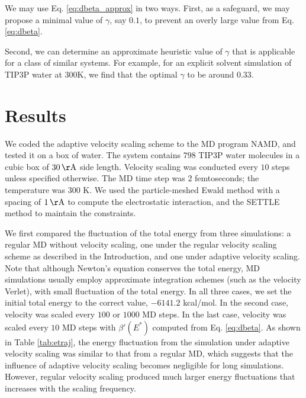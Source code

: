 \documentclass[reprint]{revtex4-1}
\begin{document}
We may use Eq. \eqref{eq:dbeta_approx} in two ways.
%
First, as a safeguard,
we may propose a minimal value of $\gamma$, say $0.1$,
to prevent an overly large value from Eq. \eqref{eq:dbeta}.

Second,
we can determine an approximate heuristic value of $\gamma$
that is applicable for a class of similar systems.
%
For example,
for an explicit solvent simulation of TIP3P water\cite{jorgensen1983}
at 300K, we find that the optimal $\gamma$
to be around $0.33$.



\section{Results}



We coded the adaptive velocity scaling scheme to
the MD program NAMD\cite{NAMD},
and tested it on a box of water.
%
The system contains
$798$ TIP3P water molecules\cite{jorgensen1983}
in a cubic box of $30 \, \mathrm{\AA}$ side length.
%
Velocity scaling was conducted every $10$ steps
unless specified otherwise.
%
The MD time step was $2$ femtoseconds;
the temperature was $300$ K.
%
We used the particle-meshed Ewald method\cite{essmann1995}
with a spacing of $1 \, \mathrm{\AA}$
to compute the electrostatic interaction,
and the SETTLE method\cite{miyamoto1992}
to maintain the constraints.


We first compared the fluctuation of the total energy
from three simulations:
%
a regular MD without velocity scaling,
one under the regular velocity scaling scheme as described in the Introduction,
and one under adaptive velocity scaling.
%
Note that although Newton's equation conserves the total energy,
MD simulations usually employ approximate integration schemes
(such as the velocity Verlet),
with
small fluctuation of the total energy.
%
In all three cases,
we set the initial total energy to the correct value, $-6141.2$ kcal/mol.
%
In the second case,
velocity was scaled every $100$ or $1000$ MD steps.
%
In the last case,
velocity was scaled every $10$ MD steps with
$\beta'(E^*)$ computed from Eq. \eqref{eq:dbeta}.
%
As shown in Table \ref{tab:etraj},
the energy fluctuation from the simulation under adaptive velocity scaling
was similar to that from a regular MD,
which suggests that the influence of adaptive velocity scaling
becomes negligible for long simulations.
%
However, regular velocity scaling
produced much larger energy fluctuations
that increases with the scaling frequency.
\end{document}
